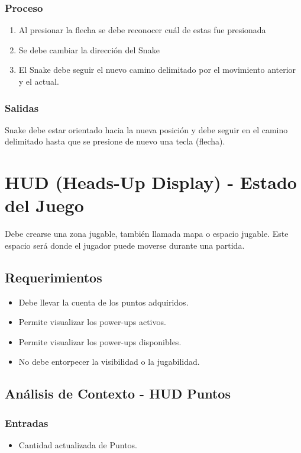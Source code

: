 \documentclass[letterpaper]{scrreprt}
\begin{document}
\subsubsection{Proceso}
\begin{enumerate}
	\item Al presionar la flecha se debe reconocer cuál de estas fue presionada
	\item Se debe cambiar la dirección del Snake
	\item El Snake debe seguir el nuevo camino delimitado por el movimiento anterior y el actual.
\end{enumerate}
\subsubsection{Salidas}
Snake debe estar orientado hacia la nueva posición y debe seguir en el camino delimitado hasta que se presione de nuevo una tecla (flecha).


\section{HUD (Heads-Up Display) - Estado del Juego}
Debe crearse una zona jugable, también llamada mapa o espacio jugable. Este espacio será donde el jugador puede moverse durante una partida.

\subsection{Requerimientos}
\begin{itemize}
	\item Debe llevar la cuenta de los puntos adquiridos.
	\item Permite visualizar los power-ups activos.
	\item Permite visualizar los power-ups disponibles.
	\item No debe entorpecer la visibilidad o la jugabilidad.
\end{itemize}

\subsection{Análisis de Contexto - HUD Puntos}
\subsubsection{Entradas}
\begin{itemize}
	\item Cantidad actualizada de Puntos.
\end{itemize}
\end{document}
